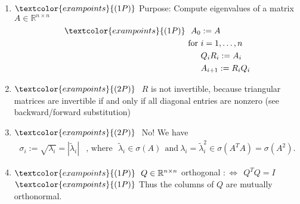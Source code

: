 {\color{solution}
\begin{enumerate}
		\item 
	$\textcolor{exampoints}{(1P)}$ Purpose: Compute eigenvalues of a matrix $A\in\mathbb{R}^{n\times n}$
	\begin{align*}
	\textcolor{exampoints}{(1P)}~~A_0&:=A\\
	\text{for}~&i=1,\dots,n\\
	&Q_iR_i:=A_i\\
	&A_{i+1}:=R_iQ_i
	\end{align*}
\item 
$\textcolor{exampoints}{(2P)}~$ $R$ is not invertible, because triangular matrices are invertible if and only if all diagonal entries are nonzero (see backward/forward substitution)
%
\item	$\textcolor{exampoints}{(2P)}~$ No! We have
\begin{align*}
\sigma_i:=\sqrt{\lambda_i}=|\tilde{\lambda}_i|& \text{,~where~~}\tilde{\lambda}_i\in\sigma(A)~~\text{and}~  \lambda_i=\tilde{\lambda}_i^2\in\sigma(A^TA)=\sigma(A^2).
\end{align*}
	\item $\textcolor{exampoints}{(1P)}~~Q\in\mathbb{R}^{n\times n}$ orthogonal $:\Leftrightarrow~~Q^TQ=I$\\
	$\textcolor{exampoints}{(1P)}$ 
	Thus the columns of $Q$ are mutually orthonormal.
\end{enumerate}
}